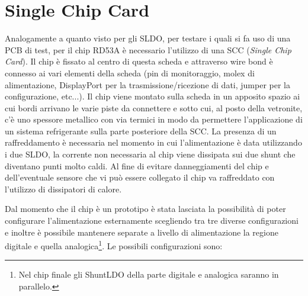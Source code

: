 \section{Single Chip Card}
Analogamente a quanto visto per gli SLDO, per  testare i quali si fa uso di una PCB di test, per il chip RD53A è necessario l'utilizzo di una SCC (\textit{Single Chip Card}). 
Il chip è fissato al centro di questa scheda e attraverso wire bond è connesso ai vari elementi della scheda (pin di monitoraggio, molex di alimentazione, DisplayPort per la trasmissione/ricezione di dati, jumper per la configurazione, etc...). 
Il chip viene montato sulla scheda in un apposito spazio ai cui bordi arrivano le varie piste da connettere e sotto cui, al posto della vetronite, c'è uno spessore metallico con via termici in modo da permettere l'applicazione di un sistema refrigerante sulla parte posteriore della SCC. 
La presenza di un raffreddamento è necessaria nel momento in cui l'alimentazione è data utilizzando i due SLDO, la corrente non necessaria al chip viene dissipata sui due shunt che diventano punti molto caldi. 
Al fine di evitare danneggiamenti del chip e dell'eventuale sensore che vi può essere collegato il chip va raffreddato con l'utilizzo di dissipatori di calore. 

Dal momento che il chip è un prototipo è stata lasciata la possibilità di poter configurare l'alimentazione esternamente scegliendo tra tre diverse configurazioni e inoltre è possibile mantenere separate a livello di alimentazione la regione digitale e quella analogica\footnote{Nel chip finale gli ShuntLDO della parte digitale e analogica saranno in parallelo.}.
Le possibili configurazioni sono:

